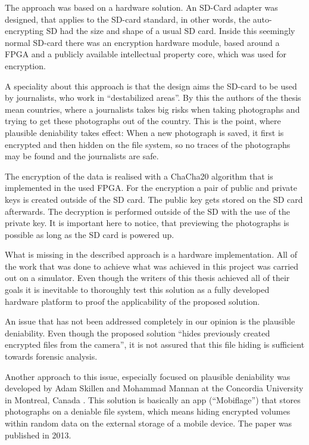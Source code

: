 \documentclass[12pt,a4paper,titlepage,oneside]{scrartcl}
\begin{document}
The approach was based on a hardware solution.
An SD-Card adapter was designed, that applies to the SD-card standard, in other words, the auto-encrypting SD had the size and shape of a usual SD card.
Inside this seemingly normal SD-card there was an encryption hardware module, based around a FPGA and a publicly available intellectual property core, which was used for encryption.

A speciality about this approach is that the design aims the SD-card to be used by journalists, who work in ``destabilized areas''.
By this the authors of the thesis mean countries, where a journalists takes big risks when taking photographs and trying to get these photographs out of the country.
This is the point, where plausible deniability takes effect: When a new photograph is saved, it first is encrypted and then hidden on the file system, so no traces of the photographs may be found and the journalists are safe.

The encryption of the data is realised with a ChaCha20 algorithm that is implemented in the used FPGA.
For the encryption a pair of public and private keys is created outside of the SD card.
The public key gets stored on the SD card afterwards.
The decryption is performed outside of the SD with the use of the private key.
It is important here to notice, that previewing the photographs is possible as long as the SD card is powered up. 

What is missing in the described approach is a hardware implementation.
All of the work that was done to achieve what was achieved in this project was carried out on a simulator.
Even though the writers of this thesis achieved all of their goals it is inevitable to thoroughly test this solution as a fully developed hardware platform to proof the applicability of the proposed solution.

An issue that has not been addressed completely in our opinion is the plausible deniability.
Even though the proposed solution ``hides previously created encrypted files from the camera'', it is not assured that this file hiding is sufficient towards forensic analysis.

Another approach to this issue, especially focused on plausible deniability was developed by Adam Skillen and Mohammad Mannan at the Concordia University in Montreal, Canada \cite{skillen2013implementing}.
This solution is basically an app (``Mobiflage'') that stores photographs on a deniable file system, which means hiding encrypted volumes within random data on the external storage of a mobile device.
The paper was published in 2013.
\end{document}
